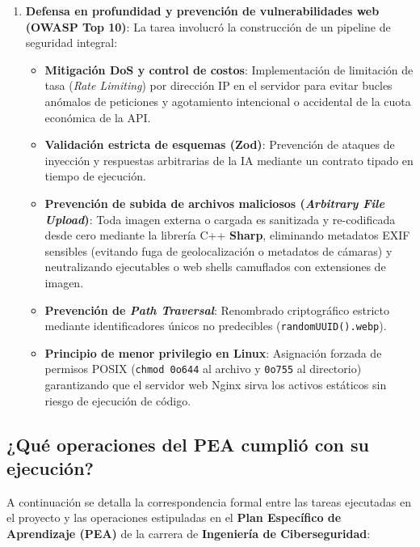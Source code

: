 \documentclass[11pt,a4paper]{article}
\begin{document}
\begin{enumerate}[label=\alph*)]
    \item \textbf{Defensa en profundidad y prevención de vulnerabilidades web (OWASP Top 10)}:
    La tarea involucró la construcción de un pipeline de seguridad integral:
    \begin{itemize}
        \item \textbf{Mitigación DoS y control de costos}: Implementación de limitación de tasa (\textit{Rate Limiting}) por dirección IP en el servidor para evitar bucles anómalos de peticiones y agotamiento intencional o accidental de la cuota económica de la API.
        \item \textbf{Validación estricta de esquemas (Zod)}: Prevención de ataques de inyección y respuestas arbitrarias de la IA mediante un contrato tipado en tiempo de ejecución.
        \item \textbf{Prevención de subida de archivos maliciosos (\textit{Arbitrary File Upload})}: Toda imagen externa o cargada es sanitizada y re-codificada desde cero mediante la librería C++ \textbf{Sharp}, eliminando metadatos EXIF sensibles (evitando fuga de geolocalización o metadatos de cámaras) y neutralizando ejecutables o web shells camuflados con extensiones de imagen.
        \item \textbf{Prevención de \textit{Path Traversal}}: Renombrado criptográfico estricto mediante identificadores únicos no predecibles (\texttt{randomUUID().webp}).
        \item \textbf{Principio de menor privilegio en Linux}: Asignación forzada de permisos POSIX (\texttt{chmod 0o644} al archivo y \texttt{0o755} al directorio) garantizando que el servidor web Nginx sirva los activos estáticos sin riesgo de ejecución de código.
    \end{itemize}
\end{enumerate}

\subsection{¿Qué operaciones del PEA cumplió con su ejecución?}

A continuación se detalla la correspondencia formal entre las tareas ejecutadas en el proyecto y las operaciones estipuladas en el \textbf{Plan Específico de Aprendizaje (PEA)} de la carrera de \textbf{Ingeniería de Ciberseguridad}:
\end{document}
